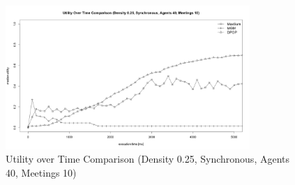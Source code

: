 \begin{figure}[H]
\centering
\includegraphics[width=350px]{graphics/experiments/static/st_3}
\caption{Utility over Time Comparison (Density 0.25, Synchronous, Agents 40, Meetings 10)}
\label{fig:st2}

\end{figure}

